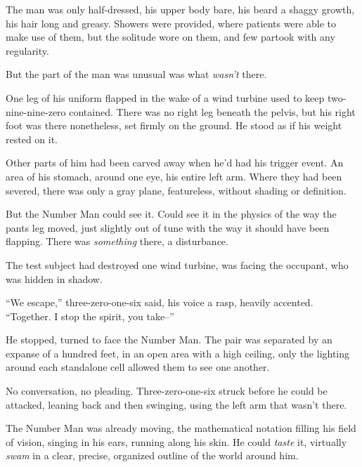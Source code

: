 The man was only half-dressed, his upper body bare, his beard a shaggy growth, his hair long and greasy.  Showers were provided, where patients were able to make use of them, but the solitude wore on them, and few partook with any regularity.



But the part of the man was unusual was what \emph{wasn't} there.



One leg of his uniform flapped in the wake of a wind turbine used to keep two-nine-nine-zero contained.  There was no right leg beneath the pelvis, but his right foot was there nonetheless, set firmly on the ground.  He stood as if his weight rested on it.



Other parts of him had been carved away when he'd had his trigger event.  An area of his stomach, around one eye, his entire left arm.  Where they had been severed, there was only a gray plane, featureless, without shading or definition.



But the Number Man could see it.  Could see it in the physics of the way the pants leg moved, just slightly out of tune with the way it should have been flapping.  There was \emph{something} there, a disturbance.



The test subject had destroyed one wind turbine, was facing the occupant, who was hidden in shadow.



``We escape,'' three-zero-one-six said, his voice a rasp, heavily accented.  ``Together.  I stop the spirit, you take--''



He stopped, turned to face the Number Man.  The pair was separated by an expanse of a hundred feet, in an open area with a high ceiling, only the lighting around each standalone cell allowed them to see one another.



No conversation, no pleading.  Three-zero-one-six struck before he could be attacked, leaning back and then swinging, using the left arm that wasn't there.



The Number Man was already moving, the mathematical notation filling his field of vision, singing in his ears, running along his skin.  He could \emph{taste} it, virtually \emph{swam }in a clear, precise, organized outline of the world around him.



